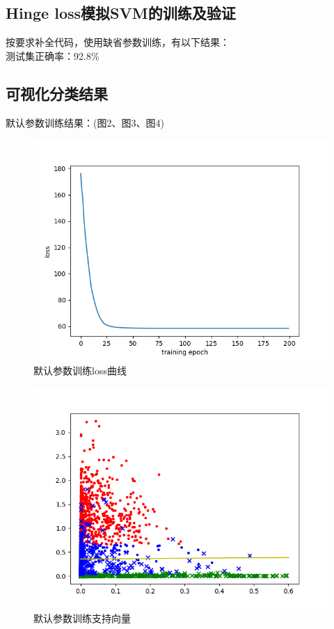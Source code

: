 \documentclass[a4paper]{article}
\begin{document}
\subsection{Hinge loss模拟SVM的训练及验证}
按要求补全代码，使用缺省参数训练，有以下结果：\\
测试集正确率：92.8\%\\

\subsection{可视化分类结果}
默认参数训练结果：(图2、图3、图4)\\
\begin{figure}
    \centering
    \includegraphics[width=12cm]{Fig_2.png}
    \caption{默认参数训练loss曲线}
\end{figure}
\begin{figure}
    \centering
    \includegraphics[width=12cm]{Fig_3.png}
    \caption{默认参数训练支持向量}
\end{figure}
\end{document}
